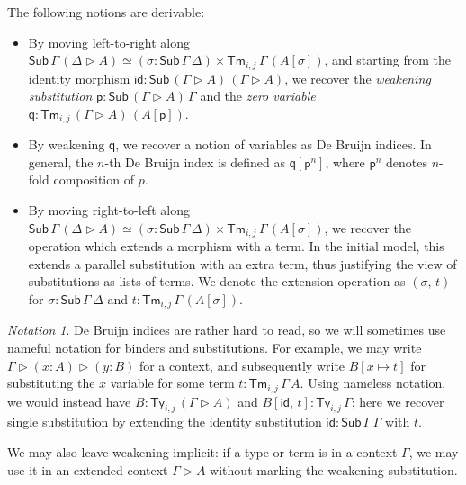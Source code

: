 \documentclass[acmsmall,screen]{acmart}
\newcommand{\msf}[1]{\mathsf{#1}}
\newcommand{\ext}{\triangleright}
\newcommand{\Sub}{\msf{Sub}}
\newcommand{\Ty}{\msf{Ty}}
\newcommand{\Tm}{\msf{Tm}}
\newcommand{\p}{\mathsf{p}}
\newcommand{\q}{\mathsf{q}}
\newcommand{\id}{\msf{id}}
\theoremstyle{remark}
\newtheorem{notation}{Notation}
\begin{document}

The following notions are derivable:
\begin{itemize}
\item
  By moving left-to-right along $\Sub\,\Gamma\,(\Delta\ext A) \simeq (\sigma :
  \Sub\,\Gamma\,\Delta) \times \Tm_{i,j}\,\Gamma\,(A[\sigma])$,
  and starting from the identity morphism $\id : \Sub\,(\Gamma\ext A)\,(\Gamma\ext A)$, we recover
  the \emph{weakening substitution} $\p : \Sub\,(\Gamma\ext A)\,\Gamma$ and the \emph{zero variable}
  $\q : \Tm_{i,j}\,(\Gamma\ext A)\,(A[\p])$.
\item
  By weakening $\q$, we recover a notion of variables as De Bruijn
  indices. In general, the $n$-th De Bruijn index is defined as $\q[\p^{n}]$,
  where $\p^{n}$ denotes $n$-fold composition of $p$.
\item
  By moving right-to-left along $\Sub\,\Gamma\,(\Delta\ext A) \simeq (\sigma :
  \Sub\,\Gamma\,\Delta) \times \Tm_{i,j}\,\Gamma\,(A[\sigma])$, we recover the
  operation which extends a morphism with a term. In the initial model, this
  extends a parallel substitution with an extra term, thus justifying the view
  of substitutions as lists of terms. We denote the extension operation as
  $(\sigma,\,t)$ for $\sigma : \Sub\,\Gamma\,\Delta$ and $t : \Tm_{i,j}\,\Gamma\,(A[\sigma])$.
\end{itemize}

\begin{notation}
De Bruijn indices are rather hard to read, so we will sometimes use nameful notation
for binders and substitutions. For example, we may write $\Gamma \ext (x : A)
\ext (y : B)$ for a context, and subsequently write $B[x \mapsto t]$ for
substituting the $x$ variable for some term $t : \Tm_{i,j}\,\Gamma\,A$. Using
nameless notation, we would instead have $B : \Ty_{i,j}\,(\Gamma \ext A)$ and
$B[\id,\,t] : \Ty_{i,j}\,\Gamma$; here we recover single substitution by extending the identity
substitution $\id : \Sub\,\Gamma\,\Gamma$ with $t$.

We may also leave weakening implicit: if a type or term is in a context
$\Gamma$, we may use it in an extended context $\Gamma \ext A$ without marking
the weakening substitution.
\end{notation}
\end{document}
